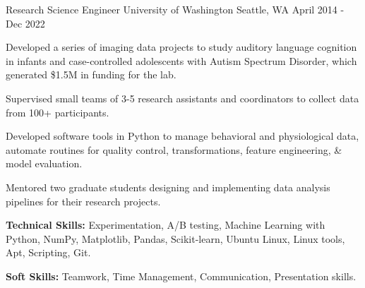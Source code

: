 

\begin{cventries}

  \cventry
  {Research Science Engineer} %
  {University of Washington} %
  {Seattle, WA} %
  {April 2014 - Dec 2022} %
  {
    \begin{cvitems} %
      \item {Developed a series of imaging data projects to study auditory language cognition in infants and case-controlled adolescents with Autism Spectrum Disorder, which generated \$1.5M in funding for the lab.}
      \item {Supervised small teams of 3-5 research assistants and coordinators to collect data from 100+ participants.} %
      \item {Developed software tools in Python to manage behavioral and physiological data, automate routines for quality control, transformations, feature engineering, \& model evaluation.}
      \item {Mentored two graduate students designing and implementing data analysis pipelines for their research projects.}
      \item {\textbf{Technical Skills:} Experimentation, A/B testing, Machine Learning with Python, NumPy, Matplotlib, Pandas, Scikit-learn, Ubuntu Linux, Linux tools, Apt, Scripting, Git.}
      \item {\textbf{Soft Skills:} Teamwork, Time Management, Communication, Presentation skills.}
    \end{cvitems}
  }


\end{cventries}

